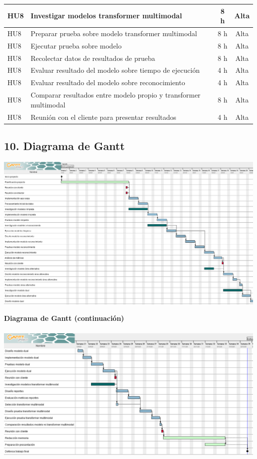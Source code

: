 \documentclass[
11pt, %
]{charter}
\begin{document}
\begin{table}[H]
\begin{tabularx}{\linewidth}{@{}|l|X|c|c|@{}}
HU8 & Investigar modelos transformer multimodal & 8 h & Alta \\ \hline
HU8 & Preparar prueba sobre modelo transformer multimodal & 8 h & Alta \\ \hline

HU8 & Ejecutar prueba sobre modelo & 8 h & Alta \\ \hline
HU8 & Recolectar datos de resultados de prueba & 8 h & Alta \\ \hline

HU8 & Evaluar resultado del modelo sobre tiempo de ejecución & 4 h & Alta \\ \hline
HU8 & Evaluar resultado del modelo sobre reconocimiento & 4 h & Alta \\ \hline
HU8 & Comparar resultados entre modelo propio y transformer multimodal & 8 h & Alta \\ \hline
HU8 & Reunión con el cliente para presentar resultados & 4 h & Alta \\ \hline

\end{tabularx}
\end{table}

\newpage
\begin{landscape}
\section{10. Diagrama de Gantt}
\includegraphics[width=1.53\textwidth]{./Figuras/Gantt-1.png}

\newpage
\textbf{Diagrama de Gantt (continuación)} \\
\\
\includegraphics[width=1.53\textwidth]{./Figuras/Gantt-2.png}

\end{landscape}
\newpage
\end{document}
